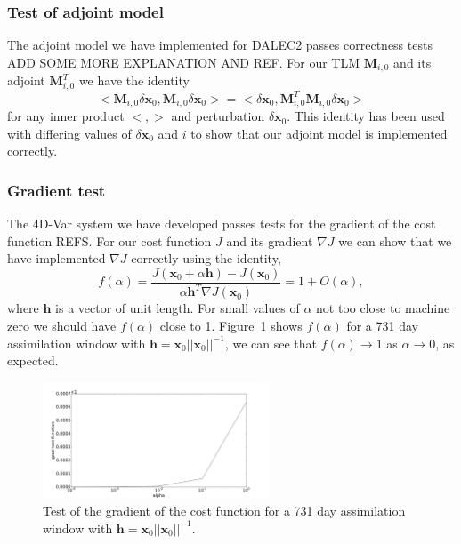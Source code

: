 \documentclass[11pt]{article}
\begin{document}
\subsubsection{Test of adjoint model} 

The adjoint model we have implemented for DALEC2 passes correctness tests ADD SOME MORE EXPLANATION AND REF. For our TLM $\mathbf{M}_{i,0}$ and its adjoint $\mathbf{M}_{i,0}^{T}$ we have the identity
\begin{equation}
<\mathbf{M}_{i,0}\delta\textbf{x}_0, \mathbf{M}_{i,0}\delta\textbf{x}_0> = <\delta\textbf{x}_0, \mathbf{M}_{i,0}^{T}\mathbf{M}_{i,0}\delta\textbf{x}_0>
\end{equation}
for any inner product $<, >$ and perturbation $\delta \textbf{x}_0$. This identity has been used with differing values of $\delta \textbf{x}_0$ and $i$ to show that our adjoint model is implemented correctly.

\subsubsection{Gradient test} \label{sec:testgrad}

The 4D-Var system we have developed passes tests for the gradient of the cost function REFS. For our cost function $J$ and its gradient $\nabla J$ we can show that we have implemented $\nabla J$ correctly using the identity,
\begin{equation}
f(\alpha)=\frac{J( \textbf{x}_0 + \alpha \textbf{h}) - J(\textbf{x}_0)}{\alpha \textbf{h}^{T} \nabla J(\textbf{x}_0)} = 1 + O(\alpha),
\end{equation}
where $\textbf{h}$ is a vector of unit length. For small values of $\alpha$ not too close to machine zero we should have $f(\alpha)$ close to 1. Figure~\ref{fig:testgradcostone} shows $f(\alpha)$ for a 731 day assimilation window with $\textbf{h}=\textbf{x}_0||\textbf{x}_0||^{-1}$, we can see that $f(\alpha) \rightarrow 1$ as $\alpha \rightarrow 0$, as expected.

\begin{figure}[ht]
    \centering
    \includegraphics[width=0.6\textwidth]{gradtestone.png}
    \caption{Test of the gradient of the cost function for a 731 day assimilation window with $\textbf{h}=\textbf{x}_0||\textbf{x}_0||^{-1}$.}
    \label{fig:testgradcostone}
\end{figure}
\end{document}
